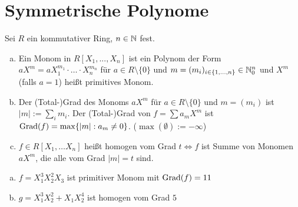 \documentclass[a4paper]{report}
\begin{document}
\section{Symmetrische Polynome}%
Sei $R$ ein kommutativer Ring, $n \in \mathbb{N}$ fest.
\begin{bez*}
\begin{enumerate}[(a)]
  \item Ein Monom in $R[X_{1}, ..., X_{n}]$ ist ein Polynom der Form $aX^{m} = aX_{1}^{m_{1}}\cdot\ldots\cdot X_{n}^{m_{n}}$ für $a \in R \setminus \{0\}$ und $m = (m_{i})_{i \in \{1, \ldots, n\}} \in \mathbb{N}_0^{n}$ und $X^{m}$ (falls $a = 1$) heißt primitives Monom.
  \item Der (Total-)Grad des Monoms $aX^{m}$ für $a \in R \setminus \{0\}$ und $m = (m_{i})$ ist $|m| := \sum_{i} m_{i}$. Der (Total-)Grad von $f = \sum a_{m}X^{m}$ ist $\operatorname{Grad}(f) = \max\{|m| : a_{m} \ne 0\}$. ($\max(\emptyset) := - \infty$)
  \item $f \in R[X_{1}, \ldots X_{n}]$ heißt homogen vom Grad $t \iff f$ ist Summe von Monomen $aX^{m}$, die alle vom Grad $|m| = t$ sind.
\end{enumerate}
\end{bez*}

\begin{bsp*}
\begin{enumerate}[(a)]
  \item $f = X_{1}^{3}X_{2}^{2}X_{3}$ ist primitiver Monom mit $\operatorname{Grad}(f) = 11$
  \item $g = X_{1}^{3}X_{2}^{2} + X_{1}X_{2}^{4}$ ist homogen vom Grad $5$
\end{enumerate}
\end{bsp*}
\end{document}
